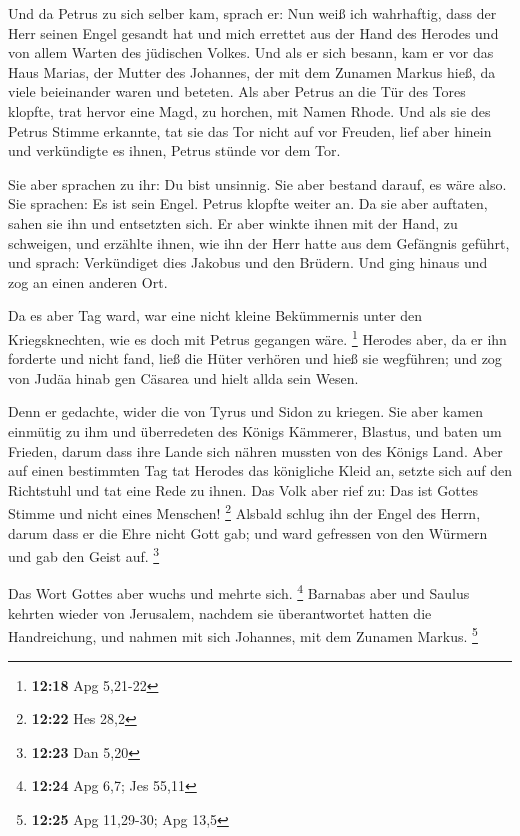  Und da Petrus zu sich selber kam, sprach er: Nun weiß ich
wahrhaftig, dass der Herr seinen Engel gesandt hat und mich errettet aus
der Hand des Herodes und von allem Warten des jüdischen Volkes.
 Und als er sich besann, kam er vor das Haus Marias, der
Mutter des Johannes, der mit dem Zunamen Markus hieß, da viele
beieinander waren und beteten.  Als aber Petrus an die Tür
des Tores klopfte, trat hervor eine Magd, zu horchen, mit Namen Rhode.
 Und als sie des Petrus Stimme erkannte, tat sie das Tor
nicht auf vor Freuden, lief aber hinein und verkündigte es ihnen, Petrus
stünde vor dem Tor.

 Sie aber sprachen zu ihr: Du bist unsinnig. Sie aber
bestand darauf, es wäre also. Sie sprachen: Es ist sein Engel.
 Petrus klopfte weiter an. Da sie aber auftaten, sahen sie
ihn und entsetzten sich.  Er aber winkte ihnen mit der
Hand, zu schweigen, und erzählte ihnen, wie ihn der Herr hatte aus dem
Gefängnis geführt, und sprach: Verkündiget dies Jakobus und den Brüdern.
Und ging hinaus und zog an einen anderen Ort.

 Da es aber Tag ward, war eine nicht kleine Bekümmernis
unter den Kriegsknechten, wie es doch mit Petrus gegangen wäre.
\footnote{\textbf{12:18} Apg 5,21-22}  Herodes aber, da er
ihn forderte und nicht fand, ließ die Hüter verhören und hieß sie
wegführen; und zog von Judäa hinab gen Cäsarea und hielt allda sein
Wesen.

 Denn er gedachte, wider die von Tyrus und Sidon zu
kriegen. Sie aber kamen einmütig zu ihm und überredeten des Königs
Kämmerer, Blastus, und baten um Frieden, darum dass ihre Lande sich
nähren mussten von des Königs Land.  Aber auf einen
bestimmten Tag tat Herodes das königliche Kleid an, setzte sich auf den
Richtstuhl und tat eine Rede zu ihnen.  Das Volk aber rief
zu: Das ist Gottes Stimme und nicht eines Menschen! \footnote{\textbf{12:22}
  Hes 28,2}  Alsbald schlug ihn der Engel des Herrn, darum
dass er die Ehre nicht Gott gab; und ward gefressen von den Würmern und
gab den Geist auf. \footnote{\textbf{12:23} Dan 5,20}

 Das Wort Gottes aber wuchs und mehrte sich. \footnote{\textbf{12:24}
  Apg 6,7; Jes 55,11}  Barnabas aber und Saulus kehrten
wieder von Jerusalem, nachdem sie überantwortet hatten die Handreichung,
und nahmen mit sich Johannes, mit dem Zunamen Markus. \footnote{\textbf{12:25}
  Apg 11,29-30; Apg 13,5}

